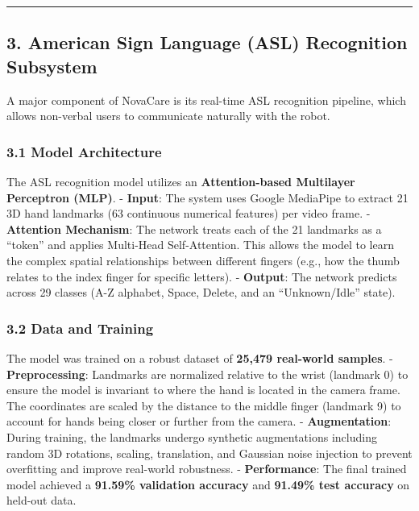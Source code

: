 \documentclass[
]{article}
\begin{document}
\begin{center}\rule{0.5\linewidth}{0.5pt}\end{center}

\subsection{3. American Sign Language (ASL) Recognition
Subsystem}\label{american-sign-language-asl-recognition-subsystem}

A major component of NovaCare is its real-time ASL recognition pipeline,
which allows non-verbal users to communicate naturally with the robot.

\subsubsection{3.1 Model Architecture}\label{model-architecture}

The ASL recognition model utilizes an \textbf{Attention-based Multilayer
Perceptron (MLP)}. - \textbf{Input}: The system uses Google MediaPipe to
extract 21 3D hand landmarks (63 continuous numerical features) per
video frame. - \textbf{Attention Mechanism}: The network treats each of
the 21 landmarks as a ``token'' and applies Multi-Head Self-Attention.
This allows the model to learn the complex spatial relationships between
different fingers (e.g., how the thumb relates to the index finger for
specific letters). - \textbf{Output}: The network predicts across 29
classes (A-Z alphabet, Space, Delete, and an ``Unknown/Idle'' state).

\subsubsection{3.2 Data and Training}\label{data-and-training}

The model was trained on a robust dataset of \textbf{25,479 real-world
samples}. - \textbf{Preprocessing}: Landmarks are normalized relative to
the wrist (landmark 0) to ensure the model is invariant to where the
hand is located in the camera frame. The coordinates are scaled by the
distance to the middle finger (landmark 9) to account for hands being
closer or further from the camera. - \textbf{Augmentation}: During
training, the landmarks undergo synthetic augmentations including random
3D rotations, scaling, translation, and Gaussian noise injection to
prevent overfitting and improve real-world robustness. -
\textbf{Performance}: The final trained model achieved a \textbf{91.59\%
validation accuracy} and \textbf{91.49\% test accuracy} on held-out
data.
\end{document}
